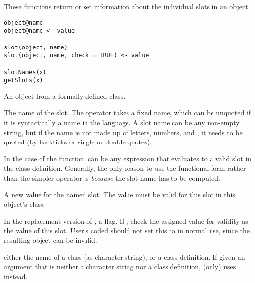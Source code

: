 %
\begin{Description}\relax
These functions return or set information about the individual slots
in an object.
\end{Description}
%
\begin{Usage}
\begin{verbatim}
object@name
object@name <- value

slot(object, name)
slot(object, name, check = TRUE) <- value

slotNames(x)
getSlots(x)

\end{verbatim}
\end{Usage}
%
\begin{Arguments}
\begin{ldescription}
\item[\code{object}] An object from a formally defined class.
\item[\code{name}] The name of the slot. The operator
takes a fixed name, which can be unquoted if it is syntactically a
name in the language.  A slot name can be any non-empty string, but
if the name is not made up of letters, numbers, and , it
needs to be quoted (by backticks or single or double quotes).

In the case of the  function,  can be any
expression that evaluates to a valid slot in the class definition.
Generally, the only reason to use the functional form rather than
the simpler operator is \emph{because} the slot name has to be computed.

\item[\code{value}] A new value for the named slot.  The value must be
valid for this slot in this object's class.
\item[\code{check}] In the replacement version of , a flag.  If
, check the assigned value for validity
as the value of this slot.  User's coded should not set this to
 in normal use, since the resulting object can be invalid.

\item[\code{x}] either the name of a class (as character string), or a class
definition.  If given an argument that is neither a character string
nor a class definition,  (only) uses 
instead.
\end{ldescription}
\end{Arguments}
